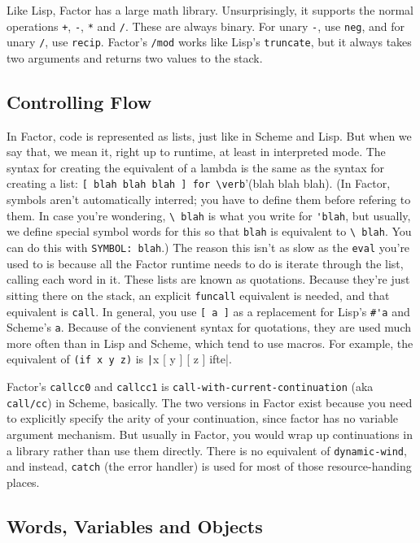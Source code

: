 \documentclass{article}
\begin{document}
Like Lisp, Factor has a large math library. Unsurprisingly, it supports the normal operations \texttt{+}, \texttt{-}, \texttt{*} and \texttt{/}. These are always binary. For unary \texttt{-}, use \texttt{neg}, and for unary \texttt{/}, use \texttt{recip}. Factor's \texttt{/mod} works like Lisp's \texttt{truncate}, but it always takes two arguments and returns two values to the stack.

\subsection{Controlling Flow}

In Factor, code is represented as lists, just like in Scheme and Lisp. But when we say that, we mean it, right up to runtime, at least in interpreted mode. The syntax for creating the equivalent of a lambda is the same as the syntax for creating a list: \verb|[ blah blah blah ] for \verb|'(blah blah blah). (In Factor, symbols aren't automatically interred; you have to define them before refering to them. In case you're wondering, \verb|\ blah| is what you write for \verb|'blah|, but usually, we define special symbol words for this so that \verb|blah| is equivalent to \verb|\ blah|. You can do this with \verb|SYMBOL: blah|.) The reason this isn't as slow as the \texttt{eval} you're used to is because all the Factor runtime needs to do is iterate through the list, calling each word in it. These lists are known as quotations. Because they're just sitting there on the stack, an explicit \texttt{funcall} equivalent is needed, and that equivalent is \texttt{call}. In general, you use \verb|[ a ]| as a replacement for Lisp's \verb|#'a| and Scheme's \verb|a|. Because of the convienent syntax for quotations, they are used much more often than in Lisp and Scheme, which tend to use macros. For example, the equivalent of \verb|(if x y z)| is \texttt|x [ y ] [ z ] ifte|.

Factor's \texttt{callcc0} and \texttt{callcc1} is \texttt{call-with-current-continuation} (aka \texttt{call/cc}) in Scheme, basically. The two versions in Factor exist because you need to explicitly specify the arity of your continuation, since factor has no variable argument mechanism. But usually in Factor, you would wrap up continuations in a library rather than use them directly. There is no equivalent of \texttt{dynamic-wind}, and instead, \texttt{catch} (the error handler) is used for most of those resource-handing places.

\subsection{Words, Variables and Objects}
\end{document}
